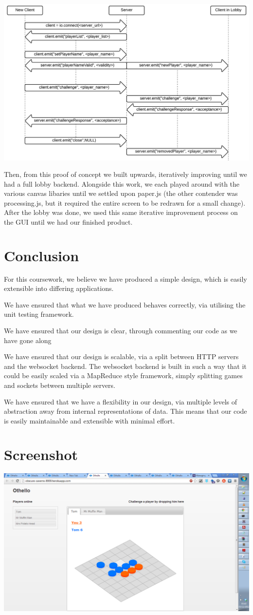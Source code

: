 \documentclass[a4wide, 11pt]{article}
\begin{document}
\includegraphics[width=\textwidth]{LobbyConnectionFlowchart.png}

Then, from this proof of concept we built upwards, iteratively improving until we had a full lobby backend. Alongside this work, we each played around with the various canvas libaries until we settled upon paper.js (the other contender was processing.js, but it required the entire screen to be redrawn for a small change). After the lobby was done, we used this same iterative improvement process on the GUI until we had our finished product.

\section{Conclusion}

For this coursework, we believe we have produced a simple design, which is easily extensible into differing applications.

We have ensured that what we have produced behaves correctly, via utilising the unit testing framework. 

We have ensured that our design is clear, through commenting our code as we have gone along

We have ensured that our design is scalable, via a split between HTTP servers and the websocket backend. The websocket backend is built in such a way that it could be easily scaled via a MapReduce style framework, simply splitting games and sockets between multiple servers.

We have ensured that we have a flexibility in our design, via multiple levels of abstraction away from internal representations of data. This means that our code is easily maintainable and extensible with minimal effort.

\section{Screenshot}

\includegraphics[width=\textwidth]{Screenshot.png}
\end{document}
